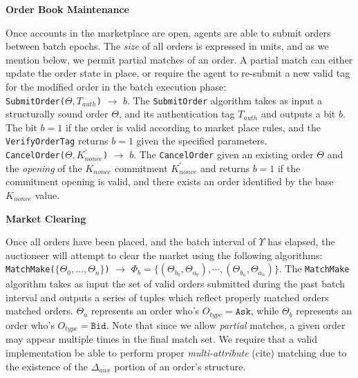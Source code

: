 \documentclass[12pt,a4paper]{article}
\theoremstyle{definition}
\begin{document}
\begin{center}
    \textbf{Order Book Maintenance}
\end{center}

Once accounts in the marketplace are open, agents are able to submit orders
between batch epochs. The \emph{size} of all orders is expressed in units, and
as we mention below, we permit partial matches of an order. A partial match can
either update the order state in place, or require the agent to re-submit a new
valid tag for the modified order in the batch execution phase: \\

\texttt{SubmitOrder($\Theta, T_{auth}$)} $\rightarrow$ $b$. The
\texttt{SubmitOrder} algorithm takes as input a structurally sound order
$\Theta$, and its authentication tag $T_{auth}$ and outputs a bit $b$. The bit
$b=1$ if the order is valid according to market place rules, and the
\texttt{VerifyOrderTag} returns $b=1$ given the specified parameters. \\

\texttt{CancelOrder($\Theta, K_{nonce}^\prime$)} $\rightarrow$ $b$. The
\texttt{CancelOrder} given an existing order $\Theta$ and the \emph{opening} of
the $K_{nonce}$ commitment $K_{nonce}^\prime$ and returns $b=1$ if the
commitment opening is valid, and there exists an order identified by the base
$K_{nonce}$ value.

\begin{center}
    \textbf{Market Clearing}
\end{center}

Once all orders have been placed, and the batch interval of $\Upsilon$ has
elapsed, the auctioneer will attempt to clear the market using the following
algorithms: \\

\texttt{MatchMake($\{\Theta_0, \ldots, \Theta_n\}$)} $\rightarrow$
$\Phi_b = \{(\Theta_{b_0}, \Theta_{a_0}), \cdots, (\Theta_{b_n}, \Theta_{a_n})\}$. The
\texttt{MatchMake} algorithm takes as input the set of valid orders submitted
during the past batch interval and outputs a series of tuples which reflect
properly matched orders matched orders. $\Theta_a$ represents an order who's
$O_{type} = \texttt{Ask}$, while $\Theta_b$ represents an order who's $O_{type}
= \texttt{Bid}$. Note that since we allow \emph{partial} matches, a given order
may appear multiple times in the final match set. We require that a valid
implementation be able to perform proper \emph{multi-attribute} (cite) matching
due to the existence of the $\Delta_{aux}$ portion of an order's structure. \\
\end{document}
